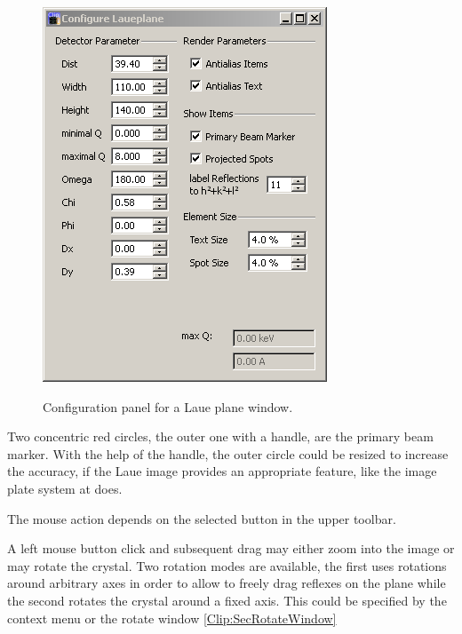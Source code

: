 \begin{figure}[htb]
\begin{minipage}[b]{0.4\textwidth}
    \includegraphics[width=\textwidth]{clip/Tool_CfgLauePlane}
    \label{Clip:FigToolCfgLauePlane}
    \caption[Laue plane configuration window]{Configuration panel for a Laue plane window.}
  \end{minipage}
\end{figure}



Two concentric red circles, the outer one with a handle, are the
primary beam marker. With the help of the handle, the outer circle could be
resized to increase the accuracy, if the Laue image provides an
appropriate feature, like the image plate system at does.

The mouse action depends on the selected button in the upper toolbar.

A left mouse button click and subsequent drag may either zoom into the
image or may rotate the crystal. Two rotation modes are available, the
first uses rotations around arbitrary axes in order to allow to freely
drag reflexes on the plane while the second rotates the crystal around
a fixed axis. This could be specified by the context menu or the
rotate window \ref{Clip:SecRotateWindow}

